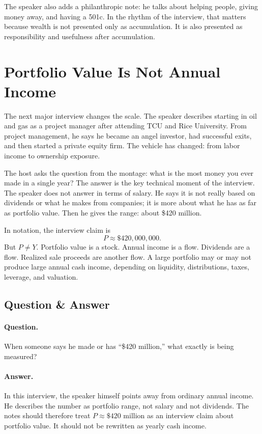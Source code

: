 The speaker also adds a philanthropic note: he talks about helping people, giving money away, and having a 501c. In the rhythm of the interview, that matters because wealth is not presented only as accumulation. It is also presented as responsibility and usefulness after accumulation.

\section{Portfolio Value Is Not Annual Income}

The next major interview changes the scale. The speaker describes starting in oil and gas as a project manager after attending TCU and Rice University. From project management, he says he became an angel investor, had successful exits, and then started a private equity firm. The vehicle has changed: from labor income to ownership exposure.

The host asks the question from the montage: what is the most money you ever made in a single year? The answer is the key technical moment of the interview. The speaker does not answer in terms of salary. He says it is not really based on dividends or what he makes from companies; it is more about what he has as far as portfolio value. Then he gives the range: about \$420 million.

In notation, the interview claim is
\begin{equation}
P\approx \$420{,}000{,}000.
\end{equation}
But \(P\neq Y\). Portfolio value is a stock. Annual income is a flow. Dividends are a flow. Realized sale proceeds are another flow. A large portfolio may or may not produce large annual cash income, depending on liquidity, distributions, taxes, leverage, and valuation.

\subsection{Question \& Answer}

\paragraph{Question.}
When someone says he made or has ``\$420 million,'' what exactly is being measured?

\paragraph{Answer.}
In this interview, the speaker himself points away from ordinary annual income. He describes the number as portfolio range, not salary and not dividends. The notes should therefore treat \(P\approx \$420\) million as an interview claim about portfolio value. It should not be rewritten as yearly cash income.


